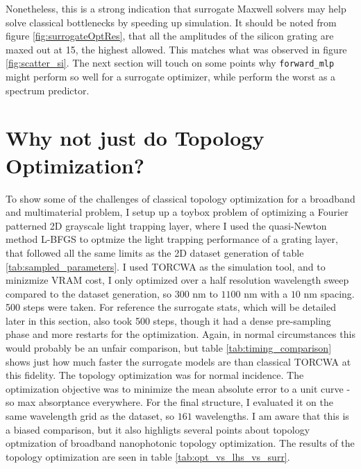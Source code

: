 Nonetheless, this is a strong indication that surrogate Maxwell solvers may help solve classical bottlenecks by speeding up simulation.
It should be noted from figure \ref{fig:surrogateOptRes}, that all the amplitudes of the silicon grating are maxed out at 15, the highest allowed. This matches what was observed in figure \ref{fig:scatter_si}. The next section will touch on some points why \texttt{forward\_mlp} might perform so well for a surrogate optimizer, while perform the worst as a spectrum predictor.

\section{Why not just do Topology Optimization?}
To show some of the challenges of classical topology optimization for a broadband and multimaterial problem, I setup up a toybox problem of optimizing a Fourier patterned 2D grayscale light trapping layer, where I used the quasi-Newton method L-BFGS to optmize the light trapping performance of a grating layer, that followed all the same limits as the 2D dataset generation of table \ref{tab:sampled_parameters}.
I used TORCWA as the simulation tool, and to minizmize VRAM cost, I only optimized over a half resolution wavelength sweep compared to the dataset generation, so $300$ nm to $1100$ nm with a $10$ nm spacing. 500 steps were taken. For reference the surrogate stats, which will be detailed later in this section, also took 500 steps, though it had a dense pre-sampling phase and more restarts for the optimization. Again, in normal circumstances this would probably be an unfair comparison, but table \ref{tab:timing_comparison} shows just how much faster the surrogate models are than classical TORCWA at this fidelity.
The topology optimization was for normal incidence. The optimization objective was to minimize the mean absolute error to a unit curve - so max absorptance everywhere. For the final structure, I evaluated it on the same wavelength grid as the dataset, so $161$ wavelengths. I am aware that this is a biased comparison, but it also highligts several points about topology optmization of broadband nanophotonic topology optimization.
The results of the topology optimization are seen in table \ref{tab:opt_vs_lhs_vs_surr}.

